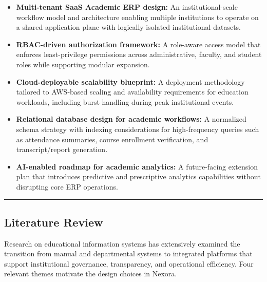 \documentclass[11pt]{article}
\providecommand{\tightlist}{%
  \setlength{\itemsep}{0pt}\setlength{\parskip}{0pt}}
\begin{document}
\begin{itemize}
\tightlist
\item
  \textbf{Multi-tenant SaaS Academic ERP design:} An institutional-scale
  workflow model and architecture enabling multiple institutions to
  operate on a shared application plane with logically isolated
  institutional datasets.
\item
  \textbf{RBAC-driven authorization framework:} A role-aware access
  model that enforces least-privilege permissions across administrative,
  faculty, and student roles while supporting modular expansion.
\item
  \textbf{Cloud-deployable scalability blueprint:} A deployment
  methodology tailored to AWS-based scaling and availability
  requirements for education workloads, including burst handling during
  peak institutional events.
\item
  \textbf{Relational database design for academic workflows:} A
  normalized schema strategy with indexing considerations for
  high-frequency queries such as attendance summaries, course enrollment
  verification, and transcript/report generation.
\item
  \textbf{AI-enabled roadmap for academic analytics:} A future-facing
  extension plan that introduces predictive and prescriptive analytics
  capabilities without disrupting core ERP operations.
\end{itemize}

\begin{center}\rule{0.5\linewidth}{0.5pt}\end{center}

\subsection{Literature Review}\label{literature-review}

Research on educational information systems has extensively examined the
transition from manual and departmental systems to integrated platforms
that support institutional governance, transparency, and operational
efficiency. Four relevant themes motivate the design choices in Nexora.
\end{document}
